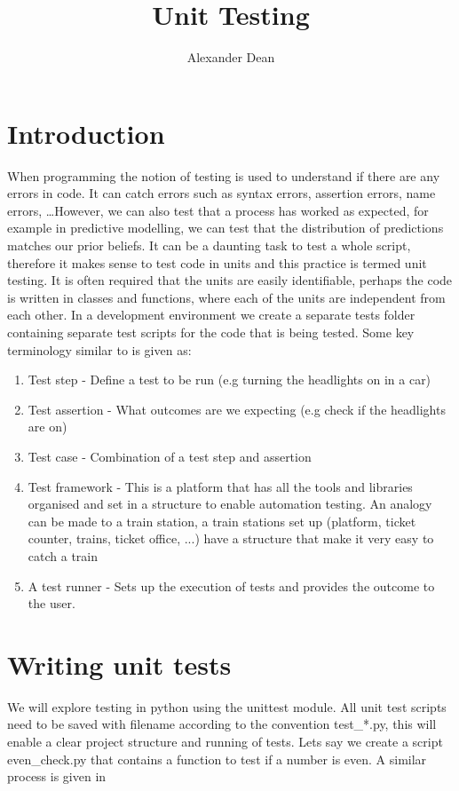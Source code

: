 \documentclass[11pt, oneside]{article}   	%
\title{Unit Testing}
\author{Alexander Dean}
\begin{document}
\maketitle
\section{Introduction}
When programming the notion of testing is used to understand if there are any errors in code. It can catch errors such as syntax errors, assertion errors, name errors, \dots However, we can also test that a process has worked as expected, for example in predictive modelling, we can test that the distribution of predictions matches our prior beliefs. It can be a daunting task to test a whole script, therefore it makes sense to test code in units and this practice is termed unit testing. It is often required that the units are easily identifiable, perhaps the code is written in classes and functions, where each of the units are independent from each other. In a development environment we create a separate tests folder containing separate test scripts for the code that is being tested. Some key terminology similar to \cite{WEBSITE:3} is given as:

\begin{enumerate}
\item Test step - Define a test to be run (e.g turning the headlights on in a car)
\item Test assertion - What outcomes are we expecting (e.g check if the headlights are on)
\item Test case - Combination of a test step and assertion
\item Test framework - This is a platform that has all the tools and libraries organised and set in a structure to enable automation testing. An analogy can be made to a train station, a train stations set up (platform, ticket counter, trains, ticket office, ...) have a structure that make it very easy to catch a train \cite{WEBSITE:1}
\item A test runner - Sets up the execution of tests and provides the outcome to the user.
\end{enumerate}

\section{Writing unit tests}
We will explore testing in python using the unittest module. All unit test scripts need to be saved with filename according to the convention test\_*.py, this will enable a clear project structure and running of tests. Lets say we create a script even\_check.py that contains a function to test if a number is even. A similar process is given in \cite{WEBSITE:2}\\
\end{document}
